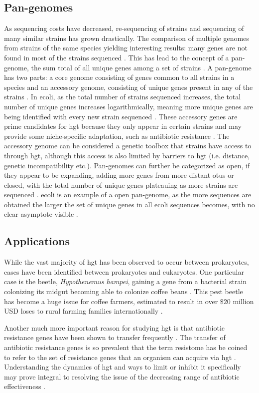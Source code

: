 \subsection{Pan-genomes}
As sequencing costs have decreased, re-sequencing of strains and sequencing of many similar strains has grown drastically.
The comparison of multiple genomes from strains of the same species yielding interesting results: many genes are not found in most of the strains sequenced \citep{toolpan}.
This has lead to the concept of a pan-genome, the sum total of all unique genes among a set of strains \citep{pang}.
A pan-genome has two parts: a core genome consisting of genes common to all strains in a species and an accessory genome, consisting of unique genes present in any of the strains \citep{pang}.
In \ac{ecoli}, as the total number of strains sequenced increases, the total number of unique genes increases logarithmically, meaning more unique genes are being identified with every new strain sequenced \citep{ecopan}.
These accessory genes are prime candidates for \ac{hgt} because they only appear in certain strains and may provide some niche-specific adaptation, such as antibiotic resistance \citep{pang}.
The accessory genome can be considered a genetic toolbox that strains have access to through \ac{hgt}, although this access is also limited by barriers to \ac{hgt} (i.e. distance, genetic incompatibility etc.).
Pan-genomes can further be categorized as open, if they appear to be expanding, adding more genes from more distant \ac{otu}s or closed, with the total number of unique genes plateauing as more strains are sequenced \citep{pang}.
\ac{ecoli} is an example of a open pan-genome, as the more sequences are obtained the larger the set of unique genes in all \ac{ecoli} sequences becomes, with no clear asymptote visible \citep{pang}.
\subsection{Applications}
While the vast majority of \ac{hgt} has been observed to occur between prokaryotes, cases have been identified between prokaryotes and eukaryotes.
One particular case is the beetle, \textit{Hypothenemus hampei}, gaining a gene from a bacterial strain colonizing its midgut becoming able to colonize coffee beans \citep{beetle}.
This pest beetle has become a huge issue for coffee farmers, estimated to result in over $\$20$ million USD loses to rural farming families internationally \citep{beetle}.\par
Another much more important reason for studying \ac{hgt} is that antibiotic resistance genes have been shown to transfer frequently \citep{amrhgt}.
The transfer of antibiotic resistance genes is so prevalent that the term resistome has be coined to refer to the set of resistance genes that an organism can acquire via \ac{hgt} \citep{amrhgt}.
Understanding the dynamics of \ac{hgt} and ways to limit or inhibit it specifically may prove integral to resolving the issue of the decreasing range of antibiotic effectiveness \citep{amrhgt}.
